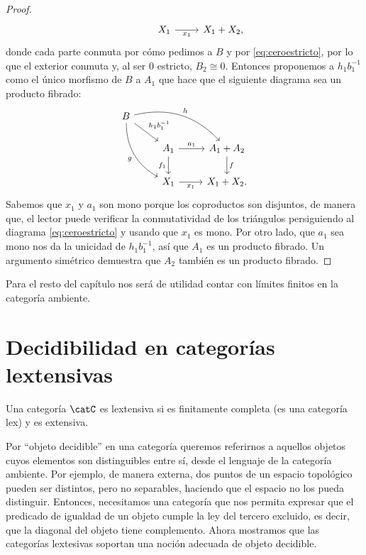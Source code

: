 \begin{proof}
\begin{equation*}
\begin{tikzcd}
      {} & X_1\ar[swap]{r}{x_1} & X_1+X_2,
    \end{tikzcd}
  \end{equation*}
  donde cada parte conmuta por cómo pedimos a $B$ y por \eqref{eq:ceroestricto}, por lo que
  el exterior conmuta y, al ser $0$ estricto, $B_2\cong 0$. Entonces proponemos
  a $h_1b_1^{-1}$ como el único morfismo de $B$ a $A_1$ que hace que el siguiente diagrama
  sea un producto fibrado:
  \begin{equation*}
    \begin{tikzcd}
      B\ar[bend left]{drr}{h}\ar[bend right,swap]{ddr}{g}\ar{dr}{h_1b_1^{-1}} \\
      & A_1\ar{r}{a_1}\ar[swap]{d}{f_1} & A_1+A_2\ar{d}{f} \\
      & X_1\ar[swap]{r}{x_1} & X_1+X_2.
    \end{tikzcd}
  \end{equation*}
  Sabemos que $x_1$ y $a_1$ son mono porque los coproductos son disjuntos, de manera que,
  el lector puede verificar la conmutatividad de los triángulos persiguiendo al diagrama
  \eqref{eq:ceroestricto} y usando que $x_1$ es mono. Por otro lado, que $a_1$ sea mono
  nos da la unicidad de $h_1b_1^{-1}$, así que $A_1$ es un producto fibrado. Un argumento 
  simétrico demuestra que $A_2$ también es un producto fibrado.
\end{proof}

Para el resto del capítulo nos será de utilidad contar con límites finitos en la categoría ambiente.

\section{Decidibilidad en categorías lextensivas}

\begin{definition}
  Una categoría $\catC$ es lextensiva si es finitamente completa (es una categoría lex)
  y es extensiva.
\end{definition}

Por ``objeto decidible'' en una categoría queremos referirnos a aquellos objetos cuyos elementos son distinguibles entre sí,
desde el lenguaje de la categoría ambiente. Por ejemplo, de manera externa, dos puntos de un espacio topológico
pueden ser distintos, pero no separables, haciendo que el espacio no los pueda distinguir. Entonces, necesitamos
una categoría que nos permita expresar que el predicado de igualdad de un objeto cumple la ley del tercero excluido, es decir,
que la diagonal del objeto tiene complemento. Ahora mostramos que las categorías lextesivas soportan una noción adecuada de objeto decidible. 

